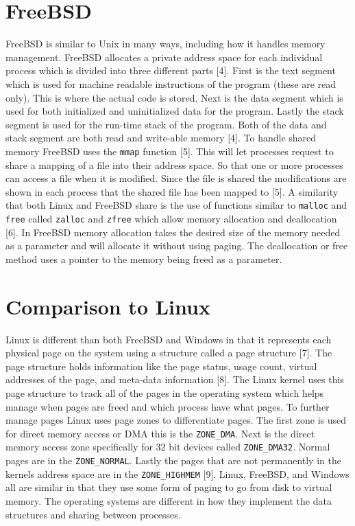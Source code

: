 \documentclass[letterpaper,10pt,titlepage,draftclsnofoot,onecolumn]{IEEEtran}
\begin{document}
\section{FreeBSD}
FreeBSD is similar to Unix in many ways, including how it handles memory management. FreeBSD allocates a private address space for each individual process which is divided into three different parts [4]. First is the text segment which is used for machine readable instructions of the program (these are read only). This is where the actual code is stored. Next is the data segment which is used for both initialized and uninitialized data for the program. Lastly the stack segment is used for the run-time stack of the program. Both of the data and stack segment are both read and write-able memory [4]. To handle shared memory FreeBSD uses the \texttt{mmap} function [5]. This will let processes request to share a mapping of a file into their address space. So that one or more processes can access a file when it is modified. Since the file is shared the modifications are shown in each process that the shared file has been mapped to [5]. A similarity that both Linux and FreeBSD share is the use of functions similar to \texttt{malloc} and \texttt{free} called \texttt{zalloc} and \texttt{zfree} which allow memory allocation and deallocation [6]. In FreeBSD memory allocation takes the desired size of the memory needed as a parameter and will allocate it without using paging. The deallocation or free method uses a pointer to the memory being freed as a parameter.

\section{Comparison to Linux}
Linux is different than both FreeBSD and Windows in that it represents each physical page on the system using a structure called a page structure [7]. The page structure holds information like the page status, usage count, virtual addresses of the page, and meta-data information [8]. The Linux kernel uses this page structure to track all of the pages in the operating system which helps manage when pages are freed and which process have what pages. To further manage pages Linux uses page zones to differentiate pages. The first zone is used for direct memory access or DMA this is the \texttt{ZONE\_DMA}. Next is the direct memory access zone specifically for 32 bit devices called \texttt{ZONE\_DMA32}. Normal pages are in the \texttt{ZONE\_NORMAL}. Lastly the pages that are not permanently in the kernels address space are in the \texttt{ZONE\_HIGHMEM} [9]. Linux, FreeBSD, and Windows all are similar in that they use some form of paging to go from disk to virtual memory. The operating systems are different in how they implement the data structures and sharing between processes. 
\end{document}
